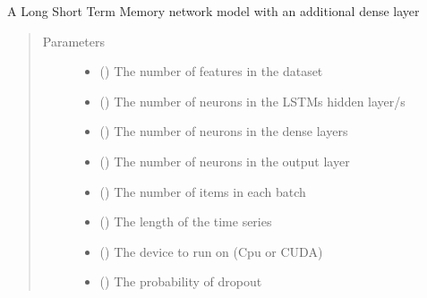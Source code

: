 \documentclass[letterpaper,10pt,english]{sphinxmanual}
\begin{document}
\begin{fulllineitems}
\label{\detokenize{models:Foresight.models.LSTM}}
A Long Short Term Memory network model with an additional dense layer
\begin{quote}\begin{description}
\item[{Parameters}] \leavevmode\begin{itemize}
\item {} 
 () \textendash{} The number of features in the dataset

\item {} 
 () \textendash{} The number of neurons in the LSTMs hidden layer/s

\item {} 
 () \textendash{} The number of neurons in the dense layers

\item {} 
 () \textendash{} The number of neurons in the output layer

\item {} 
 () \textendash{} The number of items in each batch

\item {} 
 () \textendash{} The length of the time series

\item {} 
 () \textendash{} The device to run on (Cpu or CUDA)

\item {} 
 () \textendash{} The probability of dropout


\end{itemize}
\end{description}
\end{quote}
\end{fulllineitems}
\end{document}
